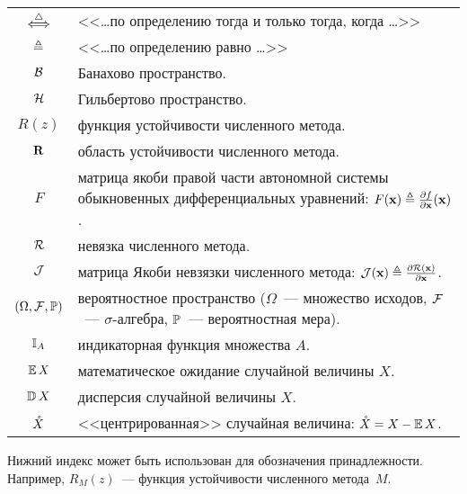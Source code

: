 \label{chapter:definitions} 

\begin{center}
    \begin{tabularx}{\textwidth}{cl}
        $ \overset{\triangle}{\Longleftrightarrow} $                      & <<\ldots по определению тогда и только тогда, когда \ldots>> \\
        $ \triangleq $                       & <<\ldots по определению равно \ldots>> \\
        \rule{0pt}{16pt}%
        $ \mathcal{B} $                 & Банахово пространство. \\
        $ \mathcal{H} $                & Гильбертово пространство. \\
        \rule{0pt}{16pt}%
        $ R(z) $                         & функция устойчивости численного метода. \\
        $ \mathbf{R} $                     & область устойчивости численного метода. \\
        $ F $                            & \makecell[l]{матрица якоби правой части автономной системы \\
                                                        обыкновенных дифференциальных уравнений:
                                                        $ F(\mathbf{x}) \triangleq \frac{\partial f}{\partial \mathbf{x}}(\mathbf{x}) $.} \\
        $ \mathcal{R} $                         & невязка численного метода. \\
        $ \mathcal{J} $                         & матрица Якоби невзязки численного метода:
                                           $ \mathcal{J}(\mathbf{x}) \triangleq \frac{\partial \mathcal{R}(\mathbf{x})}{\partial \mathbf{x}} $. \\
        \rule{0pt}{16pt}%
        $ (\Omega, \mathcal{F}, \mathbb{P}) $ & \makecell[l]{вероятностное пространство ($ \Omega $~--- множество исходов, \\
                                                        $ \mathcal{F} $~--- $ \sigma $-алгебра, $ \mathbb{P} $~--- вероятностная мера).} \\
        $ \mathbb{I}_A $                 & индикаторная функция множества $ A $. \\
        $ \operatorname{\mathbb{E}} X $                    & математическое ожидание случайной величины $ X $. \\
        $ \operatorname{\mathbb{D}} X $                & дисперсия случайной величины $ X $. \\
        $ \mathring{X} $                  & <<центрированная>> случайная величина: $ \mathring{X} = X - \operatorname{\mathbb{E}} X $. \\
    \end{tabularx}
\end{center}

Нижний индекс может быть использован для обозначения принадлежности.
Например, $ R_M(z) $~--- функция устойчивости численного метода~$ M $.
